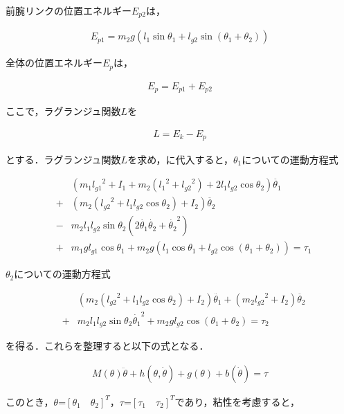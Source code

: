 前腕リンクの位置エネルギー$E_{p2}$は，

\begin{eqnarray}
  E_{p1}
  =m_{2}g(l_{1}\sin\theta_{1} + l_{g2}\sin(\theta_{1} + \theta_{2}))
\end{eqnarray}

全体の位置エネルギー$E_{p}$は，

\begin{eqnarray}
  E_{p}
  =E_{p1} + E_{p2}
\end{eqnarray}

ここで，ラグランジュ関数$L$を

\begin{eqnarray}
  L
  =E_{k} - E_{p}
\end{eqnarray}

とする．ラグランジュ関数$L$を求め，に代入すると，$\theta_{1}$についての運動方程式

\begin{eqnarray}
  &&(m_{1}{l_{g1}}^2 + I_{1} + m_{2}({l_{1}}^2 + {l_{g2}}^2)
  + 2l_{1}l_{g2}\cos\theta_{2})\ddot{\theta_{1}} \nonumber \\
  &+& (m_{2}({l_{g2}}^2 + l_{1}l_{g2}\cos\theta_{2}) + I_{2})\ddot{\theta_{2}} \nonumber \\
  &-& m_{2}l_{1}l_{g2}\sin\theta_{2}(2\dot{\theta_{1}}\dot{\theta_{2}} + {\dot{\theta_{2}}}^2)  \nonumber \\
  &+& m_{1}gl_{g1}\cos\theta_{1} + m_{2}g(l_{1}\cos\theta_{1} + l_{g2}\cos(\theta_{1} + \theta_{2})) = \tau_{1}
\end{eqnarray}

$\theta_{2}$についての運動方程式

\begin{eqnarray}
  &&(m_{2}({l_{g2}}^2 + l_{1}l_{g2}\cos\theta_{2}) + I_{2})\ddot{\theta_{1}} + (m_{2}{l_{g2}}^2 + I_{2})\ddot{\theta_{2}} \nonumber \\
  &+& m_{2}l_{1}l_{g2}\sin\theta_{2}{\dot{\theta_{1}}}^2 + m_{2}gl_{g2}\cos(\theta_{1} + \theta_{2}) = \tau_{2}
\end{eqnarray}

を得る．これらを整理すると以下の式となる．

\begin{eqnarray}
  M(\theta)\ddot{\theta} + h(\theta, \dot{\theta}) + g(\theta) + b(\dot{\theta}) = \tau
\end{eqnarray}

このとき，$\theta$=${[\theta_{1} \quad \theta_{2}]}^T$，$\tau$=${[\tau_{1} \quad \tau_{2}]}^T$であり，粘性を考慮すると，

